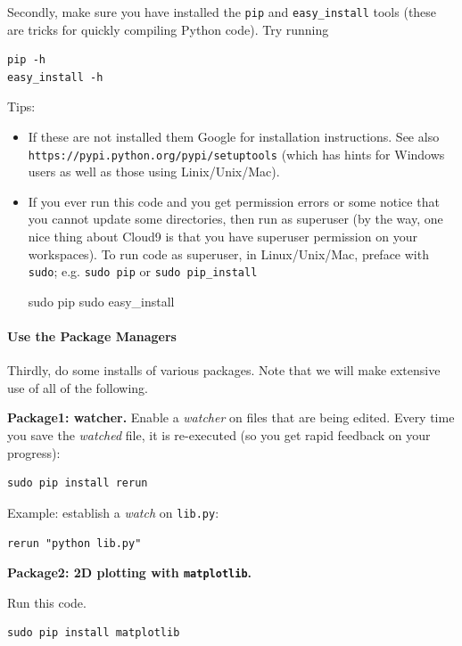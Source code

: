 Secondly, make sure you have installed the \texttt{pip} and
\texttt{easy\_install} tools (these are tricks for quickly compiling
Python code). Try running

\begin{lstlisting}
pip -h
easy_install -h
\end{lstlisting}

Tips:

\begin{itemize}
\item
  If these are not installed them Google for installation instructions.
  See also \texttt{https://pypi.python.org/pypi/setuptools} (which has
  hints for Windows users as well as those using Linix/Unix/Mac).
\item
  If you ever run this code and you get permission errors or some notice
  that you cannot update some directories, then run as superuser (by the
  way, one nice thing about Cloud9 is that you have superuser permission
  on your workspaces). To run code as superuser, in Linux/Unix/Mac,
  preface with \texttt{sudo}; e.g. \texttt{sudo\ pip} or
  \texttt{sudo\ pip\_install}

  sudo pip sudo easy\_install
\end{itemize}

\paragraph{Use the Package Managers}\label{use-the-package-managers}

Thirdly, do some installs of various packages. Note that we will make
extensive use of all of the following.

\textbf{Package1: watcher.} Enable a \emph{watcher} on files that are
being edited. Every time you save the \emph{watched} file, it is
re-executed (so you get rapid feedback on your progress):

\begin{lstlisting}
sudo pip install rerun
\end{lstlisting}

Example: establish a \emph{watch} on \texttt{lib.py}:

\begin{lstlisting}
rerun "python lib.py"
\end{lstlisting}

\textbf{Package2: 2D plotting with \texttt{matplotlib}.}

Run this code.

\begin{lstlisting}
sudo pip install matplotlib
\end{lstlisting}

